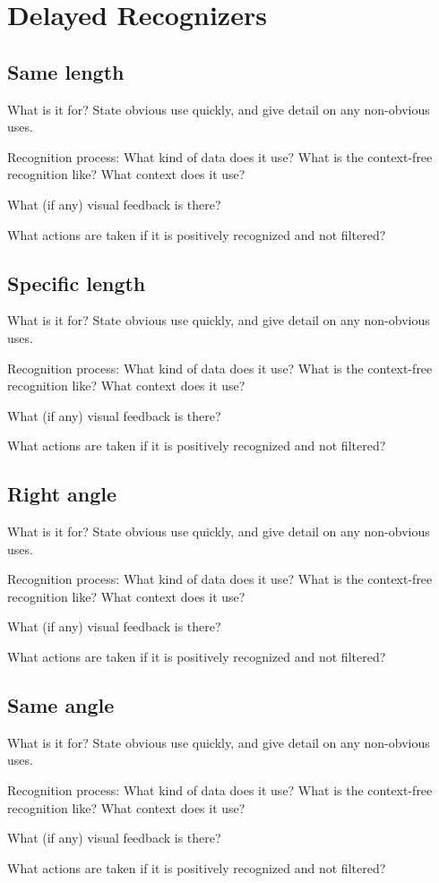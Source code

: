 \section{Delayed Recognizers}

\subsection{Same length}

What is it for? State obvious use quickly, and give detail on any
non-obvious uses.

Recognition process: What kind of data does it use? What is the
context-free recognition like? What context does it use?

What (if any) visual feedback is there?

What actions are taken if it is positively recognized and not
filtered?

\subsection{Specific length}

What is it for? State obvious use quickly, and give detail on any
non-obvious uses.

Recognition process: What kind of data does it use? What is the
context-free recognition like? What context does it use?

What (if any) visual feedback is there?

What actions are taken if it is positively recognized and not
filtered?

\subsection{Right angle}

What is it for? State obvious use quickly, and give detail on any
non-obvious uses.

Recognition process: What kind of data does it use? What is the
context-free recognition like? What context does it use?

What (if any) visual feedback is there?

What actions are taken if it is positively recognized and not
filtered?

\subsection{Same angle}

What is it for? State obvious use quickly, and give detail on any
non-obvious uses.

Recognition process: What kind of data does it use? What is the
context-free recognition like? What context does it use?

What (if any) visual feedback is there?

What actions are taken if it is positively recognized and not
filtered?
